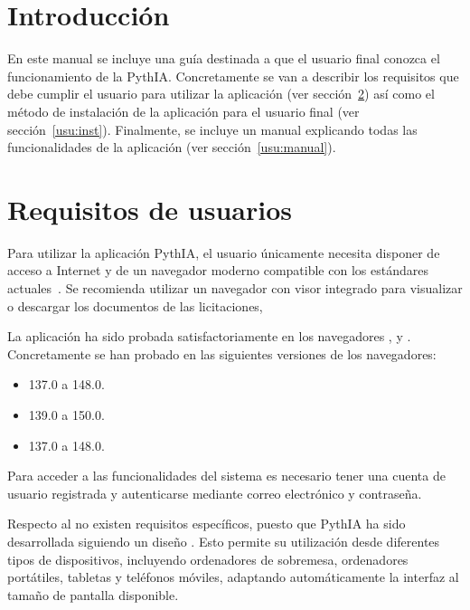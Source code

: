 
\section{Introducción}

En este manual se incluye una guía destinada a que el usuario final conozca el funcionamiento de la  PythIA. Concretamente se van a describir los requisitos que debe cumplir el usuario para utilizar la aplicación (ver sección~\ref{usu:req}) así como el método de instalación de la aplicación para el usuario final (ver sección~\ref{usu:inst}). Finalmente, se incluye un manual explicando todas las funcionalidades de la aplicación (ver sección~\ref{usu:manual}).

\section{Requisitos de usuarios}
\label{usu:req}

Para utilizar la aplicación PythIA, el usuario únicamente necesita disponer de acceso a Internet y de un navegador  moderno compatible con los estándares actuales~\cite{usuario:webStandards}. Se recomienda utilizar un navegador con visor  integrado para visualizar o descargar los documentos  de las licitaciones, 

La aplicación ha sido probada satisfactoriamente en los navegadores ,  y . Concretamente se han probado en las siguientes versiones de los navegadores:
\begin{itemize}
	\item {} 137.0 a  148.0.
	\item {} 139.0 a 150.0.
	\item {} 137.0 a 148.0.
\end{itemize}

Para acceder a las funcionalidades del sistema es necesario tener una cuenta de usuario registrada y autenticarse mediante correo electrónico y contraseña.

Respecto al  no existen requisitos específicos, puesto que PythIA ha sido desarrollada siguiendo un diseño . Esto permite su utilización desde diferentes tipos de dispositivos, incluyendo ordenadores de sobremesa, ordenadores portátiles, tabletas y teléfonos móviles, adaptando automáticamente la interfaz al tamaño de pantalla disponible. 

